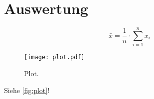 \section{Auswertung}
\label{sec:Auswertung}


\begin{equation}
  \bar{x} = \frac{1}{n} \cdot \sum_{i=1}^{n} x_i
\end{equation}


\begin{figure}
  \centering
  \texttt{[image: plot.pdf]}
  \caption{Plot.}
  \label{fig:plot}
\end{figure}


Siehe \autoref{fig:plot}!
